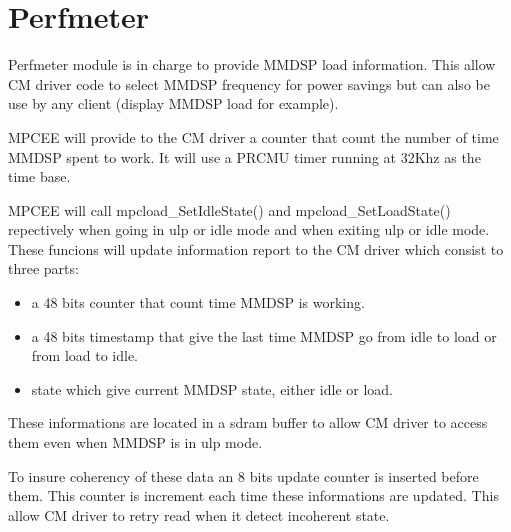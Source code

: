 \chapter{Perfmeter}
Perfmeter module is in charge to provide MMDSP load information. This allow CM
driver code to select MMDSP frequency for power savings but can also be use by
any client (display MMDSP load for example).

MPCEE will provide to the CM driver a counter that count the number of time
MMDSP spent to work. It will use a PRCMU timer running at 32Khz as the time
base.

MPCEE will call mpcload\_SetIdleState() and mpcload\_SetLoadState() repectively
when going in ulp or idle mode and when exiting ulp or idle mode. These funcions
will update information report to the CM driver which consist to three parts:
\begin{itemize}
  \item a 48 bits counter that count time MMDSP is working.
  \item a 48 bits timestamp that give the last time MMDSP go from idle to load
  or from load to idle.
  \item state which give current MMDSP state, either idle or load.
\end{itemize}
These informations are located in a sdram buffer to allow CM driver to access
them even when MMDSP is in ulp mode.

To insure coherency of these data an 8 bits update counter is inserted before
them. This counter is increment each time these informations are updated. This
allow CM driver to retry read when it detect incoherent state.

